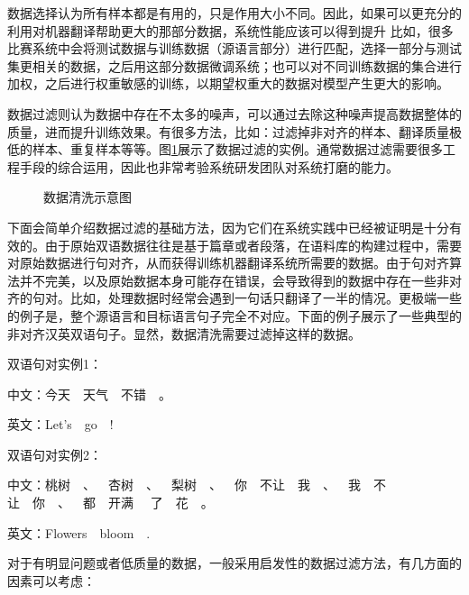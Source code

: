 \parinterval 数据选择认为所有样本都是有用的，只是作用大小不同。因此，如果可以更充分的利用对机器翻译帮助更大的那部分数据，系统性能应该可以得到提升\cite{wang-etal-2018-dynamic} 比如，很多比赛系统中会将测试数据与训练数据（源语言部分）进行匹配，选择一部分与测试集更相关的数据，之后用这部分数据微调系统\cite{DBLP:conf/wmt/LiLXLLLWZXWFCLL19,wang-etal-2018-tencent}；也可以对不同训练数据的集合进行加权，之后进行权重敏感的训练，以期望权重大的数据对模型产生更大的影响\cite{wang-etal-2018-dynamic}。

\parinterval 数据过滤则认为数据中存在不太多的噪声，可以通过去除这种噪声提高数据整体的质量，进而提升训练效果。有很多方法，比如：过滤掉非对齐的样本、翻译质量极低的样本、重复样本等等。图\ref{fig:7-6}展示了数据过滤的实例。通常数据过滤需要很多工程手段的综合运用，因此也非常考验系统研发团队对系统打磨的能力。

\begin{figure}[htp]
\centering

\caption{数据清洗示意图}
\label{fig:7-6}
\end{figure}

\parinterval 下面会简单介绍数据过滤的基础方法，因为它们在系统实践中已经被证明是十分有效的。由于原始双语数据往往是基于篇章或者段落，在语料库的构建过程中，需要对原始数据进行句对齐，从而获得训练机器翻译系统所需要的数据。由于句对齐算法并不完美，以及原始数据本身可能存在错误，会导致得到的数据中存在一些非对齐的句对。比如，处理数据时经常会遇到一句话只翻译了一半的情况。更极端一些的例子是，整个源语言和目标语言句子完全不对应。下面的例子展示了一些典型的非对齐汉英双语句子。显然，数据清洗需要过滤掉这样的数据。


\parinterval 双语句对实例1：

\parinterval 中文：今天\ \ 天气\ \ 不错\ \ 。

\parinterval 英文：Let's\ \ go\ \ !

\vspace{1em}

\parinterval 双语句对实例2：

\parinterval 中文：桃树\ \ 、\ \ 杏树\ \ 、\ \ 梨树\ \ 、\ \ 你\ \ 不让\ \ 我\ \ 、\ \ 我\ \ 不让\ \ 你\ \ 、\ \ 都\ \ 开满 \ \ 了\ \ 花\ \ 。

\parinterval 英文：Flowers\ \ bloom\ \ .

\vspace{1em}

\parinterval 对于有明显问题或者低质量的数据，一般采用启发性的数据过滤方法，有几方面的因素可以考虑：

